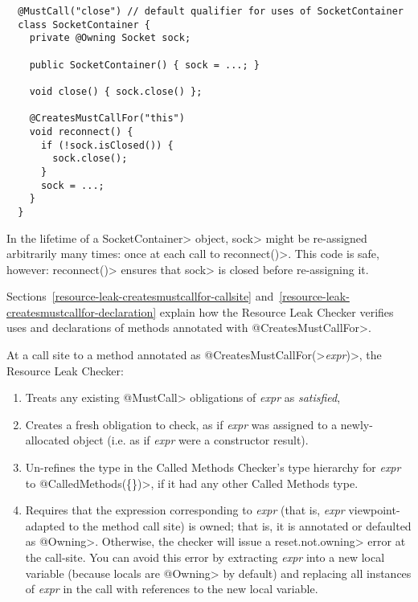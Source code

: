 \begin{verbatim}
  @MustCall("close") // default qualifier for uses of SocketContainer
  class SocketContainer {
    private @Owning Socket sock;

    public SocketContainer() { sock = ...; }

    void close() { sock.close() };

    @CreatesMustCallFor("this")
    void reconnect() {
      if (!sock.isClosed()) {
        sock.close();
      }
      sock = ...;
    }
  }
\end{verbatim}

In the lifetime of a \<SocketContainer> object, \<sock>
might be re-assigned arbitrarily many times: once at each
call to \<reconnect()>. This code is safe, however: \<reconnect()>
ensures that \<sock> is closed before re-assigning it.

Sections~\ref{resource-leak-createsmustcallfor-callsite}
and~\ref{resource-leak-createsmustcallfor-declaration}
explain how the Resource Leak Checker verifies uses and declarations of
methods annotated with \<@CreatesMustCallFor>.



At a call site to a method annotated as
\<@CreatesMustCallFor(>\emph{expr}\<)>, the Resource Leak Checker:
\begin{enumerate}
\item
  Treats any existing \<@MustCall> obligations of \emph{expr} as \emph{satisfied},
\item
  Creates a fresh obligation to check, as if \emph{expr} was assigned to a newly-allocated
  object (i.e. as if \emph{expr} were a constructor result).
\item
  Un-refines the type in the Called Methods Checker's type hierarchy for \emph{expr} to
  \<@CalledMethods(\{\})>, if it had any other Called Methods type.
\item
  Requires that the expression corresponding to \emph{expr} (that is, \emph{expr}
  viewpoint-adapted to the method call site) is owned; that is, it is
  annotated or defaulted as \<@Owning>.  Otherwise, the checker
  will issue a \<reset.not.owning> error at the call-site. You can avoid this
  error by extracting \emph{expr} into a new local variable (because
  locals are \<@Owning> by default) and replacing all instances of \emph{expr}
  in the call with references to the new local variable.
\end{enumerate}

